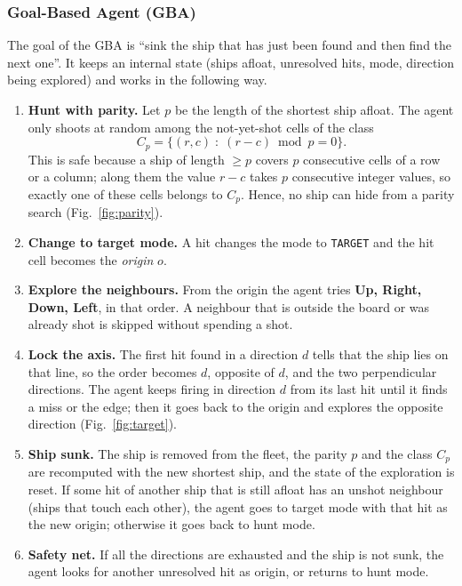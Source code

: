 \documentclass[letterpaper,11pt]{article} %
\begin{document}
\subsubsection{Goal-Based Agent (GBA)}

The goal of the GBA is ``sink the ship that has just been found and then find the next one''.
It keeps an internal state (ships afloat, unresolved hits, mode, direction being explored) and works in the following way.

\begin{enumerate}[label=\textbf{\arabic*.}]
    \item \textbf{Hunt with parity.} Let $p$ be the length of the shortest ship afloat. The agent only shoots at random among the not-yet-shot cells of the class
    \begin{equation}
        C_p=\{(r,c)\;:\;(r-c)\bmod p=0\}.
    \end{equation}
    This is safe because a ship of length $\ge p$ covers $p$ consecutive cells of a row or a column; along them the value $r-c$ takes $p$ consecutive integer values, so exactly one of these cells belongs to $C_p$. Hence, no ship can hide from a parity search (Fig.~\ref{fig:parity}).
    \item \textbf{Change to target mode.} A hit changes the mode to \texttt{TARGET} and the hit cell becomes the \emph{origin} $o$.
    \item \textbf{Explore the neighbours.} From the origin the agent tries \textbf{Up, Right, Down, Left}, in that order. A neighbour that is outside the board or was already shot is skipped without spending a shot.
    \item \textbf{Lock the axis.} The first hit found in a direction $d$ tells that the ship lies on that line, so the order becomes $d$, opposite of $d$, and the two perpendicular directions. The agent keeps firing in direction $d$ from its last hit until it finds a miss or the edge; then it goes back to the origin and explores the opposite direction (Fig.~\ref{fig:target}).
    \item \textbf{Ship sunk.} The ship is removed from the fleet, the parity $p$ and the class $C_p$ are recomputed with the new shortest ship, and the state of the exploration is reset. If some hit of another ship that is still afloat has an unshot neighbour (ships that touch each other), the agent goes to target mode with that hit as the new origin; otherwise it goes back to hunt mode.
    \item \textbf{Safety net.} If all the directions are exhausted and the ship is not sunk, the agent looks for another unresolved hit as origin, or returns to hunt mode.
\end{enumerate}
\end{document}
